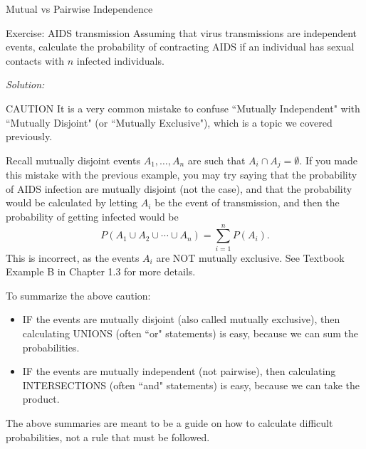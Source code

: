 \begin{frame}[allowframebreaks]{Mutual vs Pairwise Independence}
\begin{exampleblock}{Exercise: AIDS transmission}
    Assuming that virus transmissions are independent events, calculate the probability of contracting AIDS if an individual has sexual contacts with $n$ infected individuals.
  \end{exampleblock}
  
  \emph{Solution:}
  
  
  \framebreak
  
  \begin{block}{CAUTION}
    It is a very common mistake to confuse ``Mutually Independent" with ``Mutually Disjoint" (or ``Mutually Exclusive"), which is a topic we covered previously.
    
    Recall mutually disjoint events $A_1, \ldots, A_n$ are such that $A_i \cap A_j = \emptyset$. If you made this mistake with the previous example, you may try saying that the probability of AIDS infection are mutually disjoint (not the case), and that the probability would be calculated by letting $A_i$ be the event of transmission, and then the probability of getting infected would be
    $$
    P(A_1 \cup A_2 \cup \cdots \cup A_n) = \sum_{i = 1}^n P(A_i).
    $$
This is incorrect, as the events $A_i$ are NOT mutually exclusive. See Textbook Example B in Chapter 1.3 for more details. 
  \end{block}
  
  To summarize the above caution: 
  \begin{itemize}
    \item \alert{IF} the events are mutually disjoint (also called mutually exclusive), then calculating \alert{UNIONS} (often ``or" statements) is easy, because we can sum the probabilities.
    \item \alert{IF} the events are mutually independent (not pairwise), then calculating \alert{INTERSECTIONS} (often ``and" statements) is easy, because we can take the product.
  \end{itemize}
  
  The above summaries are meant to be a guide on how to calculate difficult probabilities, not a rule that must be followed.
  
\end{frame}


